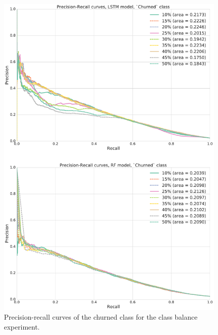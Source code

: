 \documentclass{kththesis}
\begin{document}
\begin{figure}
    \centering
    \includegraphics[width=1.0\textwidth,keepaspectratio]{figures/prc_class_balance.pdf}
    \caption{Precision-recall curves of the churned class for the class balance experiment.}
    \label{fig:prc_class_balance}
\end{figure}
\end{document}
